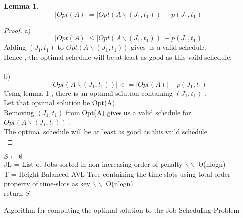 \documentclass[11pt]{article}
\newtheorem{lemma}[theorem]{Lemma}
\begin{document}
\begin{lemma}
\[ 
 \vert Opt(A) \vert = \vert Opt(A\backslash(J_1,t_1)) \vert + p(J_1,t_1) 
\]
\end{lemma}
\begin{proof}
a) 
\[ 
 \vert Opt(A) \vert \leq \vert Opt(A\backslash(J_1,t_1)) \vert + p(J_1,t_1) 
\]
Adding $(J_1,t_1)$ to $Opt(A\backslash(J_1,t_1))$ gives us a valid schedule.\\
Hence , the optimal schedule will be at least as good as this vaild schedule. \\\\
b) \\
\[ 
\ \vert Opt(A\backslash(J_1,t_1)) \vert <= \vert Opt(A) \vert - p(J_1,t_1) 
\]
Using lemma 1 , there is an optimal solution containing $(J_1,t_1)$ .\\
Let that optimal solution be Opt(A). \\
Removing $(J_1,t_1)$ from Opt(A) gives us a valid schedule for $Opt(A\backslash(J_1,t_1))$ . \\
The optimal schedule will be at least as good as this vaild schedule. \\
\end{proof}
\begin{algorithm}[h]
$S\leftarrow \emptyset$\\
JL = List of Jobs sorted in non-increasing order of penalty $\backslash \backslash$ O(nlogn) \\
T = Height Balanced AVL Tree containing the time slots  using total order property of time-slots as key $\backslash \backslash$ O(nlogn) \\
return $S$
\caption{Algorithm for computing the optimal solution to the Job Scheduling Problem}
\label{skeleton}
\end{algorithm}
\pagebreak
\end{document}
